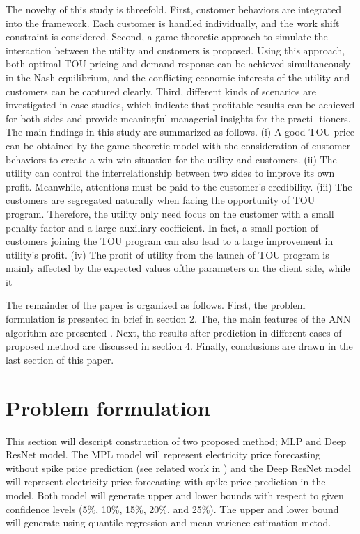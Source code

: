 \documentclass[review]{elsarticle}
\begin{document}
    The novelty of this study is threefold. First, customer behaviors are
    integrated into the framework. Each customer is handled individually, and the work shift constraint is considered. Second, a game-theoretic approach to simulate the interaction between the utility and customers is proposed. Using this approach, both optimal TOU pricing and demand response can be achieved simultaneously in the Nash-equilibrium, and the conflicting economic interests of the utility and customers can be captured clearly. Third, different kinds of scenarios are investigated in case studies, which indicate that profitable results can be achieved for both sides and provide meaningful managerial insights for the practi- tioners. The main findings in this study are summarized as follows. (i) A good TOU price can be obtained by the game-theoretic model with the consideration of customer behaviors to create a win-win situation for the utility and customers. (ii) The utility can control the interrelationship between two sides to improve its own profit. Meanwhile, attentions must be paid to the customer's credibility. (iii) The customers are segregated naturally when facing the opportunity of TOU program. Therefore, the utility only need focus on the customer with a small penalty factor and a large auxiliary coefficient. In fact, a small portion of customers joining the TOU program can also lead to a large improvement in utility's profit. (iv) The profit of utility from the launch of TOU program is mainly affected by the expected values ofthe parameters on the client side, while it


    The remainder of the paper is organized as follows. First, the problem formulation is presented in brief in section 2. The, the main features of the ANN algorithm are presented . Next, the results after prediction in different cases of proposed method  are discussed in section 4. Finally, conclusions are drawn in the last section of this paper.
  \section{Problem formulation}
    This section will descript construction of two proposed method; MLP and Deep ResNet model. The MPL model will represent electricity price forecasting without spike price prediction (see related work in \cite{Dudek2016}) and the Deep ResNet model will represent electricity price forecasting with spike price prediction in the model. Both model will generate upper and lower bounds with respect to given confidence levels (5$\%$, 10$\%$, 15$\%$, 20$\%$, and 25$\%$). The upper and lower bound will generate using quantile regression and mean-varience estimation metod.
\end{document}
